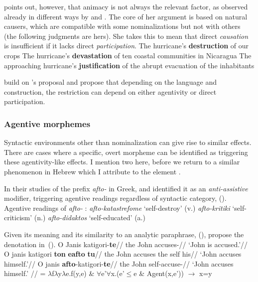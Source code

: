 {\cite{sichel10n} points out, however, that animacy is not always the relevant factor, as observed already in different ways by \cite{pesetsky95} and \cite{marantz97}. The core of her argument is based on natural causers, which are compatible with some nominalizations but not with others (the following judgments are hers). She takes this to mean that direct \emph{causation} is insufficient if it lacks direct \emph{participation}.
\pex
	\a The hurricane's \textbf{destruction} of our crops
	\a The hurricane's \textbf{devastation} of ten coastal communities in Nicaragua
\xe
\ex \ljudge{\#} The approaching hurricane's \textbf{justification} of the abrupt evacuation of the inhabitants
\xe

\cite{alexiadouetal13,alexiadouetal13jcgl} build on \citeauthor{sichel10n}'s proposal and propose that depending on the language and construction, the restriction can depend on either agentivity or direct participation.

		\subsubsection{Agentive morphemes}
Syntactic environments other than nominalization can give rise to similar effects. There are cases where a specific, overt morpheme can be identified as triggering these agentivity-like effects. I mention two here, before we return to a similar phenomenon in Hebrew which I attribute to the element {\va}.

In their studies of the prefix \emph{afto-} in Greek, \cite{alexiadouafto} and \cite{spathasetal15} identified it as an \emph{anti-assistive} modifier, triggering agentive readings regardless of syntactic category, (\nextx).
\pex Agentive readings of \emph{afto-} \citep[61]{alexiadouafto}:
	\a \emph{afto-katastrefome} `self-destroy' (v.)
	\a \emph{afto-kritiki} `self-criticism' (n.)
	\a \emph{afto-didaktos} `self-educated' (a.)
\xe

Given its meaning and its similarity to an analytic paraphrase, (\nextx), \cite{spathasetal15} propose the denotation in~(\anextx).
\pex
	\a \begingl
		\gla O Janis katigori-\textbf{te}//
		\glb the John accuses-//
		\glft `John is accused.'//
	\endgl
	\a \begingl
		\gla O janis katigori \textbf{ton} \textbf{eafto} \textbf{tu}//
		\glb the John accuses the self his//
		\glft `John accuses himself.'//
	\endgl
	\a \begingl
		\gla O janis \textbf{afto}-katigori-\textbf{te}//
		\glb the John self-accuse-//
		\glft `John accuses himself.' //
	\endgl
\xe
\ex {} = $\lambda$f$\lambda$y$\lambda$e.f(y,e) \& $\forall$e'$\forall$x.(e'$\le$e \& Agent(x,e')) $\rightarrow$ x=y 
\xe

}
